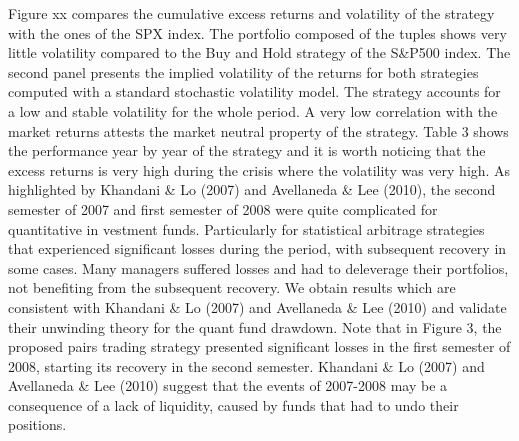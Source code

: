 \documentclass[11pt,a4,twosided,singlespacing,titlepagenumber=on]{scrreprt}
\numberwithin{equation}{chapter} %
\theoremstyle{remark}
\begin{document}
\noindent
Figure xx compares the cumulative excess returns and volatility of the strategy with the ones of the SPX index. The portfolio composed of the tuples shows very little volatility compared to the Buy and Hold strategy of the S\&P500 index. The second panel presents the implied volatility of the returns for both strategies computed with a standard stochastic volatility model. The strategy accounts for a low and stable volatility for the whole period. A very low correlation with the market returns attests the market neutral property of the strategy. Table 3 shows the performance year by year of the strategy and it is worth noticing that the excess returns is very high during the crisis where the volatility was very high. As highlighted by Khandani \& Lo (2007) and Avellaneda \& Lee (2010), the second semester of 2007 and first semester of 2008 were quite complicated for quantitative in vestment funds. Particularly for statistical arbitrage strategies that experienced significant losses during the period, with subsequent recovery in some cases. Many managers suffered losses and had to deleverage their portfolios, not benefiting from the subsequent recovery. We obtain results which are consistent with Khandani \& Lo (2007) and Avellaneda \& Lee (2010) and validate their unwinding theory for the quant fund drawdown. Note that in Figure 3, the proposed pairs trading strategy presented significant losses in the first semester of 2008, starting its recovery in the second semester. Khandani \& Lo (2007) and Avellaneda \& Lee (2010) suggest that the events of 2007-2008 may be a consequence of a lack of liquidity, caused by funds that had to undo their positions. \cite{delmoral2004}



\end{document}
